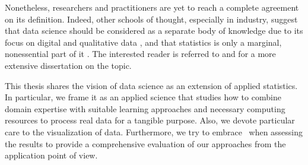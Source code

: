 Nonetheless, researchers and practitioners are yet to reach a complete agreement on its definition. 
Indeed, other schools of thought, especially in industry, suggest that data science should be considered as a separate body of knowledge due to its focus on digital and qualitative data \cite{silver2013need, priceonomics2015, dhar2013datascience}, and that statistics is only a marginal, nonessential part of it \cite{gelman2013statistics}.
The interested reader is referred to  and  for a more extensive dissertation on the topic.

This thesis shares the vision of data science as an extension of applied statistics. In particular, we frame it as an applied science that studies how to combine domain expertise with suitable learning approaches and necessary computing resources to process real data for a tangible purpose.
Also, we devote particular care to the visualization of data.
Furthermore, we try to embrace \gdsSix \, when assessing the results to provide a comprehensive evaluation of our approaches from the application point of view.